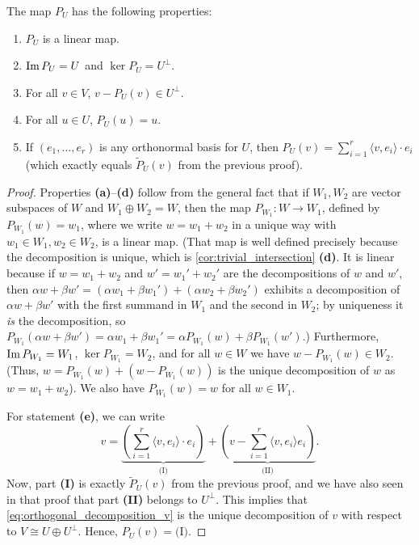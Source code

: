\begin{proposition}
\label{prop:orthogonal_projection_properties}
The map $P_U$ has the following properties:
\begin{enumerate}[label=\textbf{(\alph*)}]
    \item $P_U$ is a linear map.
    \item $\operatorname{Im} P_U = U$ and $\ker P_U = U^\perp$.
    \item For all $v \in V$, $v - P_U(v) \in U^\perp$.
    \item For all $u \in U$, $P_U(u) = u$.
    \item If $(e_1, \dots, e_r)$ is any orthonormal basis for $U$, then $P_U(v) = \sum_{i=1}^r \langle v, e_i \rangle \cdot e_i$ (which exactly equals $\widetilde{P}_U(v)$ from the previous proof).
\end{enumerate}
\end{proposition}

\begin{proof}
Properties \textbf{(a)}--\textbf{(d)} follow from the general fact that if $W_1, W_2$ are vector subspaces of $W$ and $W_1 \oplus W_2 = W$, then the map $P_{W_1} \colon W \to W_1$, defined by $P_{W_1}(w) = w_1$, where we write $w = w_1 + w_2$ in a unique way with $w_1 \in W_1, w_2 \in W_2$, is a linear map. (That map is well defined precisely because the decomposition is unique, which is \cref{cor:trivial_intersection} \textbf{(d)}. It is linear because if $w = w_1 + w_2$ and $w' = w_1' + w_2'$ are the decompositions of $w$ and $w'$, then $\alpha w + \beta w' = (\alpha w_1 + \beta w_1') + (\alpha w_2 + \beta w_2')$ exhibits a decomposition of $\alpha w + \beta w'$ with the first summand in $W_1$ and the second in $W_2$; by uniqueness it \emph{is} the decomposition, so $P_{W_1}(\alpha w + \beta w') = \alpha w_1 + \beta w_1' = \alpha P_{W_1}(w) + \beta P_{W_1}(w')$.) Furthermore, $\operatorname{Im} P_{W_1} = W_1$, $\ker P_{W_1} = W_2$, and for all $w \in W$ we have $w - P_{W_1}(w) \in W_2$. (Thus, $w = P_{W_1}(w) + (w - P_{W_1}(w))$ is the unique decomposition of $w$ as $w = w_1 + w_2$). We also have $P_{W_1}(w) = w$ for all $w \in W_1$.

For statement \textbf{(e)}, we can write
\begin{equation}
\label{eq:orthogonal_decomposition_v}
    v = \underbrace{\left( \sum_{i=1}^r \langle v, e_i \rangle \cdot e_i \right)}_{\text{(I)}} + \underbrace{\left( v - \sum_{i=1}^r \langle v, e_i \rangle e_i \right)}_{\text{(II)}}.
\end{equation}
Now, part \textbf{(I)} is exactly $\widetilde{P}_U(v)$ from the previous proof, and we have also seen in that proof that part \textbf{(II)} belongs to $U^\perp$. This implies that \eqref{eq:orthogonal_decomposition_v} is the unique decomposition of $v$ with respect to $V \cong U \oplus U^\perp$. Hence, $P_U(v) = \text{(I)}$.
\end{proof}

